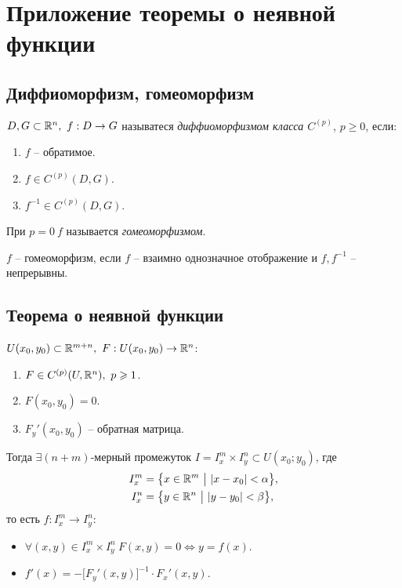 \section{Приложение теоремы о неявной функции}

\setcounter{subsection}{16}

\subsection{Диффиоморфизм, гомеоморфизм}

\begin{definition}
    $ D,G \subset \mathbb{R}^n, \ f:D \rightarrow G $ называтеся \emph{диффиоморфизмом класса $ C^{(p)} $}, $ p \geqslant 0 $, если:
    \begin{enumerate}
        \item $ f $ -- обратимое.
        \item $ f \in C^{(p)}(D,G) $.
        \item $ f^{-1} \in C^{(p)}(D,G) $.
    \end{enumerate}

    При $ p=0 \ f $ называется \emph{гомеоморфизмом}.
\end{definition}

\begin{note}
    $ f $ -- гомеоморфизм, если $ f $ -- взаимно однозначное отображение и $ f,f^{-1} $ -- непрерывны.
\end{note}

\subsection{Теорема о неявной функции}

\begin{theorem}
    $ U(x_0,y_0) \subset \R^{m+n}, \ F:U(x_0,y_0) \rightarrow \R^n $:
    \begin{enumerate}
        \item $ F\in C^{(p)}(U,\mathbb{R}^n), \ p \geqslant 1 $.
        \item $ F(x_0,y_0) = 0 $.
        \item $ F_y'(x_0,y_0) $ -- обратная матрица.
    \end{enumerate}

    Тогда $ \exists (n+m) $-мерный промежуток $ I = I_x^m \times I_y^n \subset U(x_0;y_0) $, где
    \begin{align*}
        I_x^m & = \big\{x\in \mathbb{R}^m \ \big| \ |x - x_0| < \alpha \big\}, \\
        I_x^n & = \big\{y\in \mathbb{R}^n \ \big| \ |y - y_0| < \beta \big\},
    \end{align*} то есть $ f:I_x^m \rightarrow I_y^n $:
    \begin{itemize}
        \item $ \forall (x,y) \in I_x^m \times I_y^n \ F(x,y) = 0 \iff y = f(x) $.
        \item $ f'(x) = -\big[F_y'(x,y)\big]^{-1} \cdot F_x'(x,y) $.
    \end{itemize}
\end{theorem}

